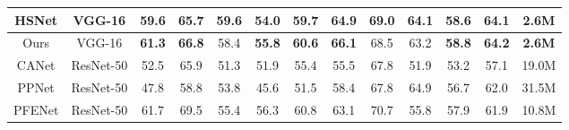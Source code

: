 \documentclass[lettersize,journal]{IEEEtran}
\begin{document}
\begin{table*}
\begin{tabular}{c|c|ccccc|ccccc|c}
HSNet \cite{RN85}                    & VGG-16                    & 59.6                                        & 65.7                                        & \textbf{59.6}                                        & 54.0                               & 59.7          & 64.9                                        & \textbf{69.0}                                        & \textbf{64.1}                                        & 58.6                               & 64.1                      & \textbf{2.6M}                                                                  \\ 
\hline
Ours                    & VGG-16                    & \textbf{61.3}                                            & \textbf{66.8}                                             & 58.4                                            & \textbf{55.8}                                   & \textbf{60.6}              & \textbf{66.1}                                            & 68.5                                            & 63.2                                            & \textbf{58.8}                                   & \textbf{64.2}                          & \textbf{2.6M}                                                                               \\ 
\hline
CANet  \cite{RN24}                   & ResNet-50                 & 52.5                                        & 65.9                                        & 51.3                                        & 51.9                               & 55.4          & 55.5                                        & 67.8                                        & 51.9                                        & 53.2                               & 57.1                      & 19.0M                                                                          \\
PPNet \cite{RN7}                   & ResNet-50                 & 47.8                                        & 58.8                                        & 53.8                                        & 45.6                               & 51.5          & 58.4                                        & 67.8                                        & 64.9                                        & 56.7                               & 62.0                      & 31.5M                                                                          \\
PFENet \cite{RN6}                  & ResNet-50                 & 61.7                                        & 69.5                                        & 55.4                                        & 56.3                               & 60.8          & 63.1                                        & 70.7                                        & 55.8                                        & 57.9                               & 61.9                      & 10.8M                                                                          \\

\end{tabular}
\end{table*}
\end{document}
